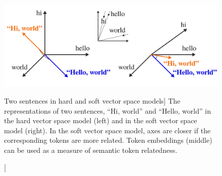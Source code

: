 \begin{figure}
\centering
\includegraphics{soft-vsm}
\vspace{-0.4cm}
\caption
  [Two sentences in hard and soft vector space models]%
  {The representations of two sentences, ``Hi, world'' and ``Hello,
   world'' in the hard vector space model (left) and in the soft vector space
   model (right). In the soft vector space model, axes are closer if the
   corresponding tokens are more related. Token embeddings (middle) can be used
   as a measure of semantic token relatedness. \cite[Figure
   6]{novotny2020three}}
\label{fig:soft-vsm}
\end{figure}

